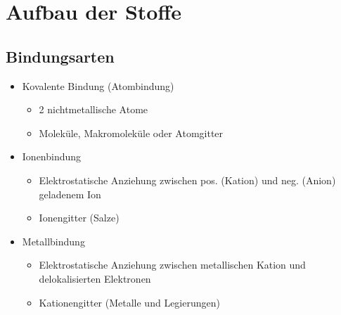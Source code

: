 \section{Aufbau der Stoffe}

\subsection{Bindungsarten}
\begin{itemize}
	\item Kovalente Bindung (Atombindung)
		\begin{itemize}
			\item 2 nichtmetallische Atome
			\item Moleküle, Makromoleküle oder Atomgitter
		\end{itemize}
	\item Ionenbindung
		\begin{itemize}
			\item Elektrostatische Anziehung zwischen pos. (Kation) und neg. (Anion) geladenem Ion
			\item Ionengitter (Salze)
		\end{itemize}
	\item Metallbindung
		\begin{itemize}
			\item Elektrostatische Anziehung zwischen metallischen Kation und delokalisierten Elektronen
			\item Kationengitter (Metalle und Legierungen)
		\end{itemize}
\end{itemize}

